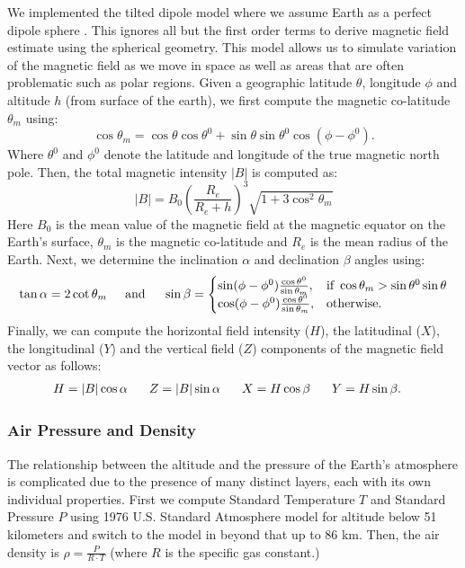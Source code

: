 \documentclass[graybox]{svmult}
\begin{document}
We implemented the tilted dipole model where we assume Earth as a perfect dipole sphere \cite[pp 27-30]{lanza2006}. This ignores all but the first order terms to derive magnetic field estimate using the spherical geometry. This model allows us to simulate variation of the magnetic field as we move in space as well as areas that are often problematic such as polar regions. Given a geographic latitude $\theta$, longitude $\phi$ and altitude $h$ (from surface of the earth), we first compute the magnetic co-latitude $\theta_m$ using:
\begin{equation*}
\cos\theta_m = \cos\theta\cos\theta^0 + \sin\theta\sin\theta^0\cos(\phi-\phi^0).
\end{equation*}
Where $\theta^0$ and $\phi^0$ denote the latitude and longitude of the true magnetic north pole. Then, the total magnetic intensity $|B|$ is computed as:
\begin{equation*}
|B| = B_0 (\frac{R_e}{R_e + h})^3\sqrt{1 + 3\cos^2\theta_m}
\end{equation*}
Here $B_0$ is the mean value of the magnetic field at the magnetic equator on the Earth's surface, $\theta_m$ is the magnetic co-latitude and $R_e$ is the mean radius of the Earth. Next, we determine the inclination $\alpha$ and declination $\beta$ angles using: 
\begin{equation*}
\tan{\alpha} = 2\cot\theta_m \hspace{0.2in} \mbox{and} \hspace{0.2in} \sin\beta = 
\begin{cases}
\sin(\phi-\phi^0)\frac{\cos\theta^0}{\sin\theta_m}, & \mbox{if } \cos\theta_m > \sin\theta^0\sin\theta\\ 
\cos(\phi-\phi^0)\frac{\cos\theta^0}{\sin\theta_m}, & \mbox{otherwise}.
\end{cases}
\end{equation*}
Finally, we can compute the horizontal field intensity ($H$), the latitudinal ($X$), the longitudinal ($Y$) and the vertical field ($Z$) components of the magnetic field vector as follows:
\begin{align*}
H &= |B|\cos\alpha &\hspace{0.1in} Z &= |B|\sin\alpha &\hspace{0.1in} X &= H\cos\beta &\hspace{0.1in} Y &= H\sin\beta.
\end{align*}

\subsubsection{Air Pressure and Density}
\label{sec:PressureAndAir}
The relationship between the altitude and the pressure of the Earth's atmosphere is complicated due to the presence of many distinct layers, each with its own individual properties. First we compute Standard Temperature $T$ and Standard Pressure $P$ using 1976 U.S. Standard Atmosphere model \cite[eq 1.16, 1.17]{stull2016practical} for altitude below 51 kilometers and switch to the model in \cite[Table 4]{Braeunig} beyond that up to 86 km. Then, the air density is $\rho = \frac{P}{R \cdot T}$ (where $R$ is the specific gas constant.) 
\end{document}
